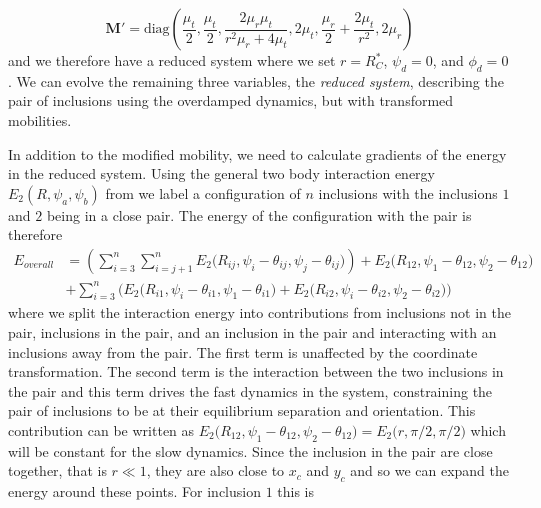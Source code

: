 \begin{equation}
    \mathbf{M}'=\mathrm{diag}\left(\frac{\mu_t}{2},\frac{\mu_t}{2},\frac{2 \mu_r \mu_t}{r^2\mu_r+4\mu_t},2\mu_t,\frac{\mu_r}{2}+\frac{2 \mu_t}{r^2},2\mu_r\right)
\end{equation}
and we therefore have a reduced system where we set $r=R^*_C$, $\psi_d=0$, and $\phi_d=0$. We can evolve the remaining three variables, the \textit{reduced system}, describing the pair of inclusions using the overdamped dynamics, but with transformed mobilities.

In addition to the modified mobility, we need to calculate gradients of the energy in the reduced system. Using the general two body interaction energy $E_2(R, \psi_a, \psi_b)$ from  we label a configuration of $n$ inclusions with the inclusions $1$ and $2$ being in a close pair. The energy of the configuration with the pair is therefore
\begin{equation}
\begin{split}
    E_{overall} &= \left(\sum_{i=3}^{n}\sum_{i=j+1}^{n}E_{2}\big(R_{ij}, \psi_i-\theta_{ij}, \psi_j-\theta_{ij}\big)\right) + E_{2}\big(R_{12}, \psi_1-\theta_{12}, \psi_2-\theta_{12}\big)\\
    &+ \sum_{i=3}^{n}\Big(E_{2}\big(R_{i1}, \psi_i-\theta_{i1}, \psi_1-\theta_{i1}\big) + E_{2}\big(R_{i2}, \psi_i-\theta_{i2}, \psi_2-\theta_{i2}\big)\Big)
\end{split}
\end{equation}
where we split the interaction energy into contributions from inclusions not in the pair, inclusions in the pair, and an inclusion in the pair and interacting with an inclusions away from the pair. The first term is unaffected by the coordinate transformation. The second term is the interaction between the two inclusions in the pair and this term drives the fast dynamics in the system, constraining the pair of inclusions to be at their equilibrium separation and orientation. This contribution can be written as $E_{2}\big(R_{12}, \psi_1-\theta_{12}, \psi_2-\theta_{12}\big) = E_{2}\big(r, \pi/2, \pi/2\big)$ which will be constant for the slow dynamics. Since the inclusion in the pair are close together, that is $r \ll 1$, they are also close to $x_c$ and $y_c$ and so we can expand the energy around these points. For inclusion $1$ this is
